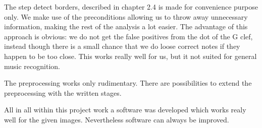 The step detect borders, described in chapter 2.4 is made for convenience purpose only. We make use of the preconditions allowing us to throw away unnecessary information, making the rest of the analysis a lot easier. The advantage of this approach is obvious: we do not get the false positives from the dot of the G clef, instead though there is a small chance that we do loose correct notes if they happen to be too close. This works really well for us, but it not suited for general music recognition.

The preprocessing works only rudimentary. There are possibilities to extend the preprocessing with the written stages. 

All in all within this project work a software was developed which works realy well for the given images. Nevertheless software can always be improved.